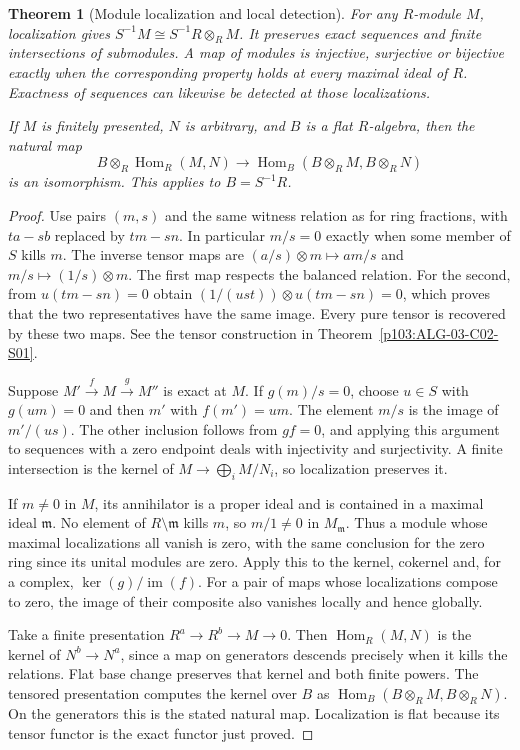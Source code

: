 \documentclass[11pt,oneside,openany]{book}
\newtheorem{theorem}{Theorem}[chapter]
\theoremstyle{definition}
\theoremstyle{remark}
\begin{document}
\begin{theorem}[Module localization and local detection]\label{p103:ALG-05-C01-S01}
For any \(R\)-module \(M\), localization gives \(S^{-1}M\cong S^{-1}R\otimes_R M\). It preserves exact sequences and finite intersections of submodules. A map of modules is injective, surjective or bijective exactly when the corresponding property holds at every maximal ideal of \(R\). Exactness of sequences can likewise be detected at those localizations.

If \(M\) is finitely presented, \(N\) is arbitrary, and \(B\) is a flat \(R\)-algebra, then the natural map
\[
 B\otimes_R\operatorname{Hom}_R(M,N)
 \longrightarrow\operatorname{Hom}_B(B\otimes_RM,B\otimes_RN)
\]
is an isomorphism. This applies to \(B=S^{-1}R\).
\end{theorem}
\begin{proof}
Use pairs \((m,s)\) and the same witness relation as for ring fractions, with \(ta-sb\) replaced by \(tm-sn\). In particular \(m/s=0\) exactly when some member of \(S\) kills \(m\). The inverse tensor maps are
\((a/s)\otimes m\mapsto am/s\) and \(m/s\mapsto (1/s)\otimes m\).
The first map respects the balanced relation. For the second, from \(u(tm-sn)=0\) obtain
\((1/(ust))\otimes u(tm-sn)=0\), which proves that the two representatives have the same image. Every pure tensor is recovered by these two maps. See the tensor construction in Theorem~\ref{p103:ALG-03-C02-S01}.

Suppose \(M'\xrightarrow{f}M\xrightarrow{g}M''\) is exact at \(M\). If \(g(m)/s=0\), choose \(u\in S\) with \(g(um)=0\) and then \(m'\) with \(f(m')=um\). The element \(m/s\) is the image of \(m'/(us)\). The other inclusion follows from \(gf=0\), and applying this argument to sequences with a zero endpoint deals with injectivity and surjectivity. A finite intersection is the kernel of \(M\to\bigoplus_i M/N_i\), so localization preserves it.

If \(m\ne0\) in \(M\), its annihilator is a proper ideal and is contained in a maximal ideal \(\mathfrak m\). No element of \(R\setminus\mathfrak m\) kills \(m\), so \(m/1\ne0\) in \(M_{\mathfrak m}\). Thus a module whose maximal localizations all vanish is zero, with the same conclusion for the zero ring since its unital modules are zero. Apply this to the kernel, cokernel and, for a complex, \(\ker(g)/\operatorname{im}(f)\). For a pair of maps whose localizations compose to zero, the image of their composite also vanishes locally and hence globally.

Take a finite presentation \(R^a\to R^b\to M\to0\). Then \(\operatorname{Hom}_R(M,N)\) is the kernel of \(N^b\to N^a\), since a map on generators descends precisely when it kills the relations. Flat base change preserves that kernel and both finite powers. The tensored presentation computes the kernel over \(B\) as \(\operatorname{Hom}_B(B\otimes_R M,B\otimes_R N)\). On the generators this is the stated natural map. Localization is flat because its tensor functor is the exact functor just proved.
\end{proof}
\end{document}
